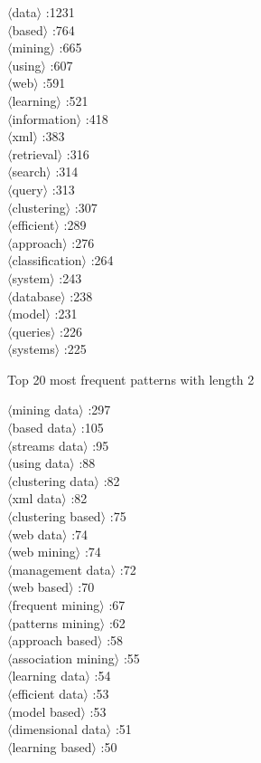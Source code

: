 \documentclass[11pt,a4paper,fleqn]{article}
\begin{document}
\begin{multicols}{4} \noindent 
$\langle$data$\rangle$ :1231\\
$\langle$based$\rangle$ :764\\
$\langle$mining$\rangle$ :665\\
$\langle$using$\rangle$ :607\\
$\langle$web$\rangle$ :591\\
$\langle$learning$\rangle$ :521\\
$\langle$information$\rangle$ :418\\
$\langle$xml$\rangle$ :383\\
$\langle$retrieval$\rangle$ :316\\
$\langle$search$\rangle$ :314\\
$\langle$query$\rangle$ :313\\
$\langle$clustering$\rangle$ :307\\
$\langle$efficient$\rangle$ :289\\
$\langle$approach$\rangle$ :276\\
$\langle$classification$\rangle$ :264\\
$\langle$system$\rangle$ :243\\
$\langle$database$\rangle$ :238\\
$\langle$model$\rangle$ :231\\
$\langle$queries$\rangle$ :226\\
$\langle$systems$\rangle$ :225\\
\end{multicols} \noindent
Top 20 most frequent patterns with length 2
\begin{multicols}{3} \noindent
$\langle$mining data$\rangle$ :297\\
$\langle$based data$\rangle$ :105\\
$\langle$streams data$\rangle$ :95\\
$\langle$using data$\rangle$ :88\\
$\langle$clustering data$\rangle$ :82\\
$\langle$xml data$\rangle$ :82\\
$\langle$clustering based$\rangle$ :75\\
$\langle$web data$\rangle$ :74\\
$\langle$web mining$\rangle$ :74\\
$\langle$management data$\rangle$ :72\\
$\langle$web based$\rangle$ :70\\
$\langle$frequent mining$\rangle$ :67\\
$\langle$patterns mining$\rangle$ :62\\
$\langle$approach based$\rangle$ :58\\
$\langle$association mining$\rangle$ :55\\
$\langle$learning data$\rangle$ :54\\
$\langle$efficient data$\rangle$ :53\\
$\langle$model based$\rangle$ :53\\
$\langle$dimensional data$\rangle$ :51\\
$\langle$learning based$\rangle$ :50\\
\end{multicols} \noindent
\end{document}
